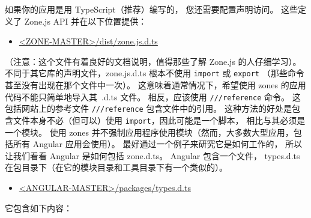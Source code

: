 


如果你的应用是用 TypeScript（推荐）编写的，
您还需要配置声明访问。 这些定义了 Zone.js API 并在以下位置提供：

\begin{itemize}
  \item \href{https://github.com/angular/zone.js/blob/master/dist/zone.js.d.ts}
        {<ZONE-MASTER>/dist/zone.js.d.ts}
\end{itemize}


（注意：这个文件有着良好的文档说明，值得那些了解 Zone.js 的人仔细学习）。
不同于其它库的声明文件，zone.js.d.ts 根本不使用 \texttt{import} 或 \texttt{export}
（那些命令甚至没有出现在那个文件中一次）。
这意味着通常情况下，希望使用 zones 的应用代码不能只简单地导入其\, .d.ts 文件。
相反，应该使用 \texttt{///reference} 命令。
这包括网站上的参考文件 \texttt{///reference} 包含文件中的引用。
这种方法的好处是包含文件本身不必（但可以）使用 \texttt{import}，因此可能是一个脚本，
相比与其必须是一个模块。
使用 zones 并不强制应用程序使用模块（然而，大多数大型应用，包括所有 Angular 应用会使用）。
最好通过一个例子来研究它是如何工作的，
所以让我们看看 Angular 是如何包括 zone.d.ts。 Angular 包含一个文件，
types.d.ts 在包目录下（在它的模块目录和工具目录下有一个类似的）。

\begin{itemize}
  \item \href{https://github.com/angular/angular/blob/master/modules/types.d.ts}
        {<ANGULAR-MASTER>/packages/types.d.ts}
\end{itemize}


它包含如下内容：




